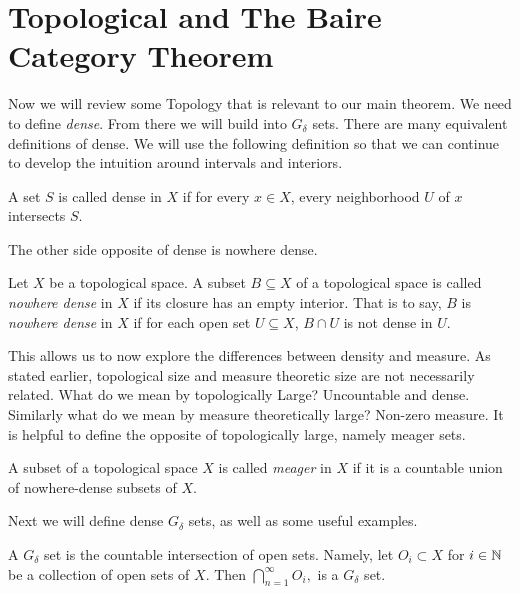\section{Topological and The Baire Category Theorem}
Now we will review some Topology that is relevant to our main theorem.  We need to define \textit{dense}.  From there we will build into $G_\delta$ sets.     There are many equivalent definitions of dense.  We will use the following definition so that we can continue to develop the intuition around intervals and interiors. 

\begin{definition}[Dense]
    A set $S$ is called dense in $X$ if for every $x \in X$, every neighborhood $U$ of $x$ intersects $S$.  
\end{definition}

The other side opposite of dense is nowhere dense.

\begin{definition}  Let $X$ be a topological space.  A subset $B \subseteq X$ of a topological space is called \textit{nowhere dense} in $X$ if its closure has an empty interior.  That is to say, $B$ is \textit{nowhere dense} in $X$ if for each open set $U\subseteq X$, $B\cap U$ is not dense in $U$.      
\end{definition}



This allows us to now explore the differences between density and measure.  As stated earlier, topological size and measure theoretic size are not necessarily related.  What do we mean by topologically Large? Uncountable and dense.  Similarly what do we mean by measure theoretically large?  Non-zero measure. It is helpful to define the opposite of topologically large, namely meager sets.



\begin{definition}[Meager]  A subset of a topological space $X$ is called \textit{meager} in $X$ if it is a countable union of nowhere-dense subsets of $X$.    
\end{definition}

Next we will define dense $G_\delta$ sets, as well as some useful examples.  
\begin{definition}
    A $G_\delta$ set is the countable intersection of open sets.  Namely, let $O_i \subset X$ for $i \in \mathbb{N}$ be a collection of open sets of $X$.  Then 
    $\bigcap_{n=1}^\infty O_i,$ is a $G_\delta$ set.  
\end{definition}

